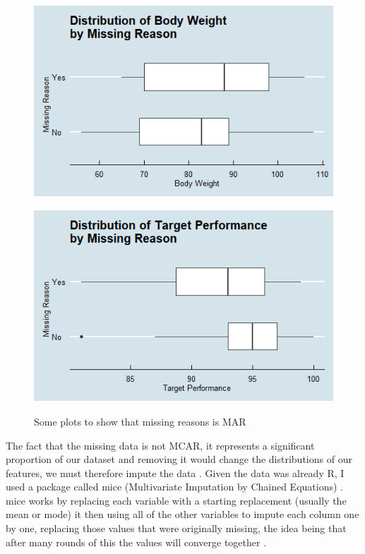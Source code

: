 \begin{figure}[h]
\centering
\begin{minipage}{.5\textwidth}
  \centering
  \includegraphics[width=.9\linewidth]{images/plot_dist_weight.png}
  \label{fig:plot_dist_weight}
\end{minipage}%
\begin{minipage}{.5\textwidth}
  \centering
  \includegraphics[width=.9\linewidth]{images/plot_dist_perf.png}
  \label{fig:plot_dist_perf}
\end{minipage}

\caption{Some plots to show that missing reasons is MAR}
\end{figure}

The fact that the missing data is not MCAR, it represents a significant proportion of our dataset and removing it would change the distributions of our features, we must therefore impute the data \cite{cheema2014}. Given the data was already R, I used a package called mice (Multivariate Imputation by Chained Equations) \cite{packmice}. mice works by replacing each variable with a starting replacement (usually the mean or mode) it then using all of the other variables to impute each column one by one, replacing those values that were originally missing, the idea being that after many rounds of this the values will converge together \cite{azur2011}. 

